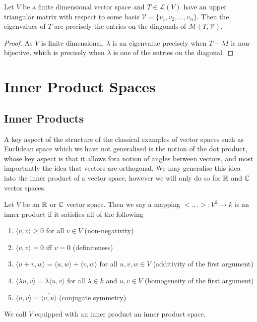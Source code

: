 \documentclass[]{article}
\begin{document}
\begin{thm}
		Let $V$ be a finite dimensional vector space and $T \in \mathcal{L}(V)$  have an upper triangular matrix with respect to some basis $\mathcal{V} = \{v_1, v_2, \ldots, v_n\}$. Then the eigenvalues of $T$ are precisely the entries on the diagonals of $\mathcal{M}(T,\mathcal{V})$.
\end{thm}

\begin{proof}
		As $V$ is finite dimensional, $\lambda$ is an eigenvalue precisely when $T - \lambda I$ is non-bijective, which is precisely when $\lambda$ is one of the entries on the diagonal.
\end{proof}

\section{Inner Product Spaces}
		
\subsection{Inner Products}

A key aspect of the structure of the classical examples of vector spaces such as Euclidean space which we have not generalised is the notion of the dot product, whose key aspect is that it allows fora notion of angles between vectors, and most importantly the idea that vectors are orthogonal. We may generalise this idea into the inner product of a vector space, however we will only do so for $\mathbb{R}$ and $\mathbb{C}$ vector spaces.

\begin{defi} 
	Let $V$ be an $\mathbb{R}$ or $\mathbb{C}$ vector space. Then we say a mapping $<.,.>: V^2 \to k$ is an inner product if it satisfies all of the following
	\begin{enumerate}
			\item $\langle v, v \rangle \geq 0$ for all $v \in V$ (non-negativity)
			\item $\langle v, v \rangle = 0$ iff $v = 0$ (definiteness)
			\item $\langle u+v, w \rangle = \langle u, w \rangle + \langle v, w \rangle $ for all $u,v,w \in V$ (additivity of the first argument)
			\item $\langle \lambda u, v \rangle = \lambda \langle u, v \rangle $ for all $\lambda \in k$ and $u,v \in V$ (homogeneity of the first argument)
			\item $\langle u, v \rangle = \overline{\langle v, u \rangle }$ (conjugate symmetry)
	\end{enumerate}

	We call $V$ equipped with an inner product an inner product space.
\end{defi}
\end{document}
